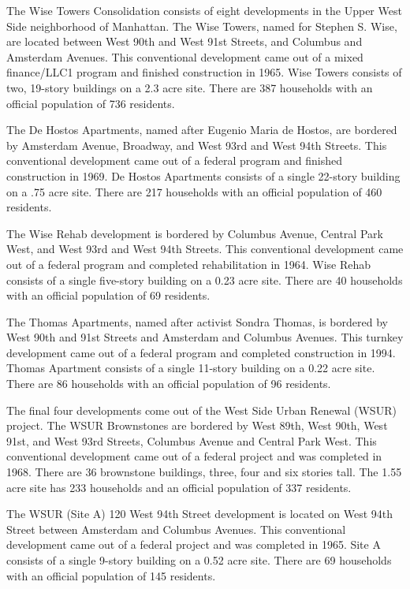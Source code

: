 

The Wise Towers Consolidation consists of eight developments in the Upper West Side neighborhood of Manhattan. The Wise Towers, named for Stephen S. Wise, are located between West 90th and West 91st Streets, and Columbus and Amsterdam Avenues. This conventional development came out of a mixed finance/LLC1 program and finished construction in 1965. Wise Towers consists of two, 19-story buildings on a 2.3 acre site. There are 387 households with an official population of 736 residents. 

The De Hostos Apartments, named after Eugenio Maria de Hostos, are bordered by Amsterdam Avenue, Broadway, and West 93rd and West 94th Streets. This conventional development came out of a federal program and finished construction in 1969. De Hostos Apartments consists of a single 22-story building on a .75 acre site. There are 217 households with an official population of 460 residents.

The Wise Rehab development is bordered by Columbus Avenue, Central Park West, and West 93rd and West 94th Streets. This conventional development came out of a federal program and completed rehabilitation in 1964. Wise Rehab consists of a single five-story building on a 0.23 acre site. There are 40 households with an official population of 69 residents.

The Thomas Apartments, named after activist Sondra Thomas, is bordered by West 90th and 91st Streets and Amsterdam and Columbus Avenues. This turnkey development came out of a federal program and completed construction in 1994. Thomas Apartment consists of a single 11-story building on a 0.22 acre site. There are 86 households with an official population of 96 residents. 

The final four developments come out of the West Side Urban Renewal (WSUR) project. The WSUR Brownstones are bordered by West 89th, West 90th, West 91st, and West 93rd Streets, Columbus Avenue and Central Park West. This conventional development came out of a federal project and was completed in 1968. There are 36 brownstone buildings, three, four and six stories tall. The 1.55 acre site has 233 households and an official population of 337 residents. 

The WSUR (Site A) 120 West 94th Street development is located on West 94th Street between Amsterdam and Columbus Avenues. This conventional development came out of a federal project and was completed in 1965. Site A consists of a single 9-story building on a 0.52 acre site. There are 69 households with an official population of 145 residents.

